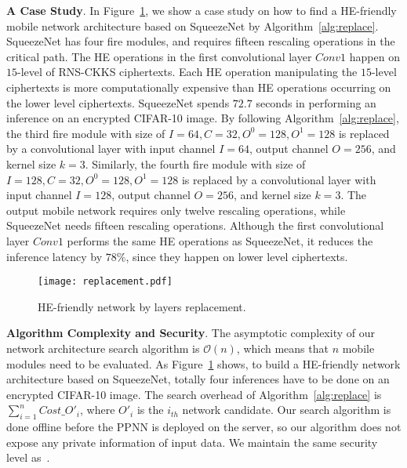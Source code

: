 \documentclass{article}
\begin{document}

  



\textbf{A Case Study}. In Figure~\ref{f:method1}, we show a case study on how to find a HE-friendly mobile network architecture based on SqueezeNet by Algorithm~\ref{alg:replace}. SqueezeNet has four fire modules, and requires fifteen rescaling operations in the critical path. The HE operations in the first convolutional layer $Conv1$ happen on $15$-level of RNS-CKKS ciphertexts. Each HE operation manipulating the $15$-level ciphertexts is more computationally expensive than HE operations occurring on the lower level ciphertexts. SqueezeNet spends $72.7$ seconds in performing an inference on an encrypted CIFAR-10 image. By following Algorithm~\ref{alg:replace}, the third fire module with size of $I=64, C=32, O^0=128, O^1=128$ is replaced by a convolutional layer with input channel $I=64$, output channel $O=256$, and kernel size $k=3$. Similarly, the fourth fire module with size of $I=128, C=32, O^0=128, O^1=128$ is replaced by a convolutional layer with input channel $I=128$, output channel $O=256$, and kernel size $k=3$. The output mobile network requires only twelve rescaling operations, while SqueezeNet needs fifteen rescaling operations. Although the first convolutional layer $Conv1$ performs the same HE operations as SqueezeNet, it reduces the inference latency by $78\%$, since they happen on lower level ciphertexts.



		
\begin{figure}[t!]
		\centering
		\texttt{[image: replacement.pdf]}
		\vspace{-0.3in}
		\caption{HE-friendly network by layers replacement.}
		\label{f:method1}
\end{figure}



\textbf{Algorithm Complexity and Security}. The asymptotic complexity of our network architecture search algorithm is $\mathcal{O}(n)$, which means that $n$ mobile modules need to be evaluated. As Figure~\ref{f:method1} shows, to build a HE-friendly network architecture based on SqueezeNet, totally four inferences have to be done on an encrypted CIFAR-10 image. The search overhead of Algorithm~\ref{alg:replace} is $\sum_{i=1}^{n}Cost\_O'_i$, where $O'_i$ is the $i_{th}$ network candidate. Our search algorithm is done offline before the PPNN is deployed on the server, so our algorithm does not expose any private information of input data. We maintain the same security level as~\cite{dathathri:2019PLDI,Dathathri:PLDI20:EVA}.  
	
\end{document}
